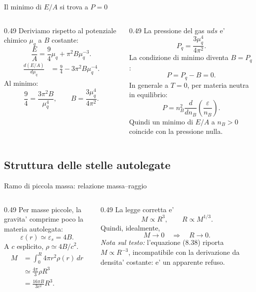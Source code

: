 \begin{frame}{Il minimo di $E/A$ si trova a $P=0$}
\small
\begin{columns}[T,onlytextwidth]
\begin{column}{0.49\textwidth}
Deriviamo rispetto al potenziale chimico
$\mu_q$ a $B$ costante:
\[
\frac EA=\frac94\mu_q+\pi^2B\mu_q^{-3}.
\]
\begin{align*}
\frac{d(E/A)}{d\mu_q}
&=\frac94-3\pi^2B\mu_q^{-4}.
\end{align*}
Al minimo:
\[
\frac94=\frac{3\pi^2B}{\mu_q^4},
\qquad
B=\frac{3\mu_q^4}{4\pi^2}.
\]
\end{column}
\begin{column}{0.49\textwidth}
La pressione del gas $uds$ e'
\[
P_q=\frac{3\mu_q^4}{4\pi^2}.
\]
La condizione di minimo diventa $B=P_q$:
\[
P=P_q-B=0.
\]
In generale a $T=0$, per materia neutra
in equilibrio:
\[
P=n_B^2\frac{d}{dn_B}
\left(\frac{\varepsilon}{n_B}\right).
\]
Quindi un minimo di $E/A$ a $n_B>0$
coincide con la pressione nulla.
\end{column}
\end{columns}
\end{frame}

\subsection{Struttura delle stelle autolegate}

\begin{frame}{Ramo di piccola massa: relazione massa--raggio}
\small
\begin{columns}[T,onlytextwidth]
\begin{column}{0.49\textwidth}
Per masse piccole, la gravita' comprime
poco la materia autolegata:
\[
\varepsilon(r)\simeq\varepsilon_s=4B.
\]
A $c$ esplicito, $\rho\simeq4B/c^2$.
\begin{align*}
M&=\int_0^R 4\pi r^2\rho(r)\,dr\\
&\simeq\frac{4\pi}{3}\rho R^3\\
&=\frac{16\pi B}{3c^2}R^3.
\end{align*}
\end{column}
\begin{column}{0.49\textwidth}
La legge corretta e'
\[
M\propto R^3,\qquad R\propto M^{1/3}.
\]
Quindi, idealmente,
\[
M\to0\quad\Rightarrow\quad R\to0.
\]
\medskip
\textit{Nota sul testo:} l'equazione (8.38)
riporta $M\propto R^{-3}$, incompatibile
con la derivazione da densita' costante:
e' un apparente refuso.
\end{column}
\end{columns}
\end{frame}

